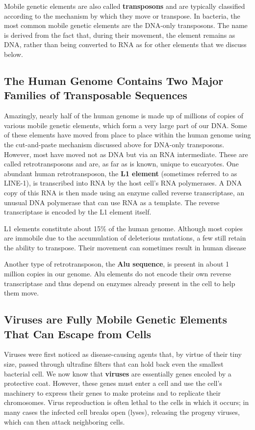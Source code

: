 Mobile genetic elements are also called \textbf{transposons} and are typically
classified according to the mechanism by which they move or transpose.
In bacteria, the most common mobile genetic elements are the DNA-only
transposons. The name is derived from the fact that, during their movement,
the element remains as DNA, rather than being converted to RNA as
for other elements that we discuss below.

\subsection{The Human Genome Contains Two Major Families of Transposable Sequences}

Amazingly, nearly half of the human genome is made up of millions of
copies of various mobile genetic elements, which form a very large part
of our DNA. Some of these elements have moved from place to place
within the human genome using the cut-and-paste mechanism discussed
above for DNA-only transposons. However, most have
moved not as DNA but via an RNA intermediate. These are called retrotransposons
and are, as far as is known, unique to eucaryotes.
One abundant human retrotransposon, the \textbf{L1 element} (sometimes referred
to as LINE-1), is transcribed into RNA by the host cell’s RNA polymerases.
A DNA copy of this RNA is then made using an enzyme called reverse
transcriptase, an unusual DNA polymerase that can use RNA as a template.
The reverse transcriptase is encoded by the L1 element itself.

L1 elements constitute about 15\% of the human genome. Although most
copies are immobile due to the accumulation of deleterious mutations, a
few still retain the ability to transpose. Their movement can sometimes
result in human disease

Another type of retrotransposon, the \textbf{Alu sequence}, is present in about
1 million copies in our genome. Alu elements do not encode their own
reverse transcriptase and thus depend on enzymes already present in the
cell to help them move.

\subsection{Viruses are Fully Mobile Genetic Elements That Can Escape from Cells}

Viruses were first noticed as disease-causing agents that, by virtue of
their tiny size, passed through ultrafine filters that can hold back even the
smallest bacterial cell. We now know that \textbf{viruses} are essentially genes
encoled by a protective coat.
However, these genes must enter a
cell and use the cell’s machinery to express their genes to make proteins
and to replicate their chromosomes. Virus reproduction is often lethal to
the cells in which it occurs; in many cases the infected cell breaks open
(lyses), releasing the progeny viruses, which can then attack neighboring
cells.

